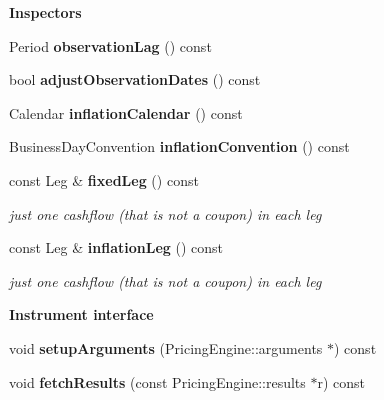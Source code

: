 \begin{Indent}{\bf Inspectors}
\begin{DoxyCompactItemize}
\item 
Period {\bfseries observation\+Lag} () const \label{class_quant_lib_1_1_zero_coupon_inflation_swap_a90beb8e91b947bd4a8fb8bea6e1147a1}

\item 
bool {\bfseries adjust\+Observation\+Dates} () const \label{class_quant_lib_1_1_zero_coupon_inflation_swap_a7ca319fc2a4d965830ec6b304b0f3bee}

\item 
Calendar {\bfseries inflation\+Calendar} () const \label{class_quant_lib_1_1_zero_coupon_inflation_swap_a82ec7c5d480d755a9d8808c8185c5ecb}

\item 
Business\+Day\+Convention {\bfseries inflation\+Convention} () const \label{class_quant_lib_1_1_zero_coupon_inflation_swap_a385c6b3bf930db04861204e92307c077}

\item 
const Leg \& {\bf fixed\+Leg} () const \label{class_quant_lib_1_1_zero_coupon_inflation_swap_a0a5d4166babde9e3958e31b41f97184c}

\begin{DoxyCompactList}\small\item\em just one cashflow (that is not a coupon) in each leg \end{DoxyCompactList}\item 
const Leg \& {\bf inflation\+Leg} () const \label{class_quant_lib_1_1_zero_coupon_inflation_swap_a23e4da6ab05d99514f1d6a17a142d8fb}

\begin{DoxyCompactList}\small\item\em just one cashflow (that is not a coupon) in each leg \end{DoxyCompactList}\end{DoxyCompactItemize}
\end{Indent}
\begin{Indent}{\bf Instrument interface}\par
\begin{DoxyCompactItemize}
\item 
void {\bfseries setup\+Arguments} (Pricing\+Engine\+::arguments $\ast$) const \label{class_quant_lib_1_1_zero_coupon_inflation_swap_a3f6ee3e2ed7e0b1b5eb12ec5c55547d2}

\item 
void {\bfseries fetch\+Results} (const Pricing\+Engine\+::results $\ast$r) const \label{class_quant_lib_1_1_zero_coupon_inflation_swap_a67de924598e4f159c75cc5249726cbe0}

\end{DoxyCompactItemize}
\end{Indent}
